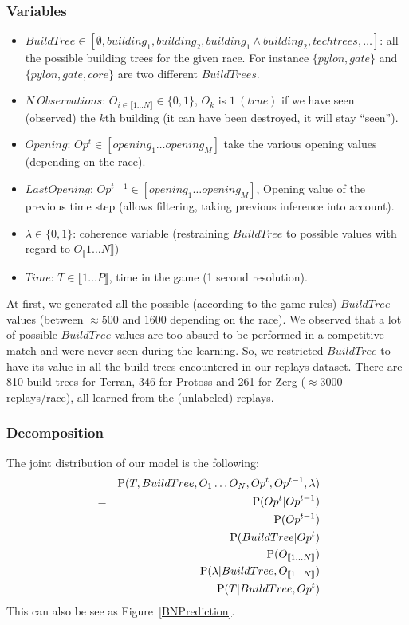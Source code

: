 \subsubsection{Variables}
\begin{itemize}
\item $BuildTree \in [\emptyset, building_1, building_2, building_1\wedge building_2, techtrees, \dots]$: all the possible building trees for the given race. For instance $\{pylon, gate\}$ and $\{pylon, gate, core\}$ are two different $BuildTrees$.
\item $N\ Observations$: $O_{i \in \llbracket 1\dots N \rrbracket} \in \{0, 1\}$, $O_k$ is $1\ (true)$ if we have seen (observed) the $k$th building (it can have been destroyed, it will stay ``seen'').
\item $Opening$: $Op^t \in [opening_1 \dots opening_M]$ take the various opening values (depending on the race).
\item $LastOpening$: $Op^{t-1} \in [opening_1 \dots opening_M]$, Opening value of the previous time step (allows filtering, taking previous inference into account).
\item $\lambda \in \{0, 1\}$: coherence variable (restraining $BuildTree$ to possible values with regard to $O_\llbracket 1 \dots N \rrbracket$)
\item $Time$: $T \in \llbracket 1\dots P \rrbracket$, time in the game (1 second resolution).
\end{itemize}

At first, we generated all the possible (according to the game rules) $BuildTree$ values (between $\approx 500$ and $1600$ depending on the race). We observed that a lot of possible $BuildTree$ values are too absurd to be performed in a competitive match and were never seen during the learning. So, we restricted $BuildTree$ to have its value in all the build trees encountered in our replays dataset. 
There are 810 build trees for Terran, 346 for Protoss and 261 for Zerg ($\approx 3000$ replays/race), all learned from the (unlabeled) replays.

\subsubsection{Decomposition}
The joint distribution of our model is the following:
\begin{eqnarray}
    & & \mathrm{P}(T, BuildTree, O_1 \dots O_N, Op^t, Op^{t-1}, \lambda) \\ 
& = &   \mathrm{P}(Op^t | Op^{t-1}) \\
    & & \mathrm{P}(Op^{t-1}) \\
    & & \mathrm{P}(BuildTree | Op^t) \\
    & & \mathrm{P}(O_{\llbracket 1 \dots N\rrbracket}) \\
    & & \mathrm{P}(\lambda | BuildTree, O_{\llbracket 1 \dots N\rrbracket}) \\
    & & \mathrm{P}(T | BuildTree, Op^t) 
\end{eqnarray}
This can also be see as Figure~\ref{BNPrediction}.

